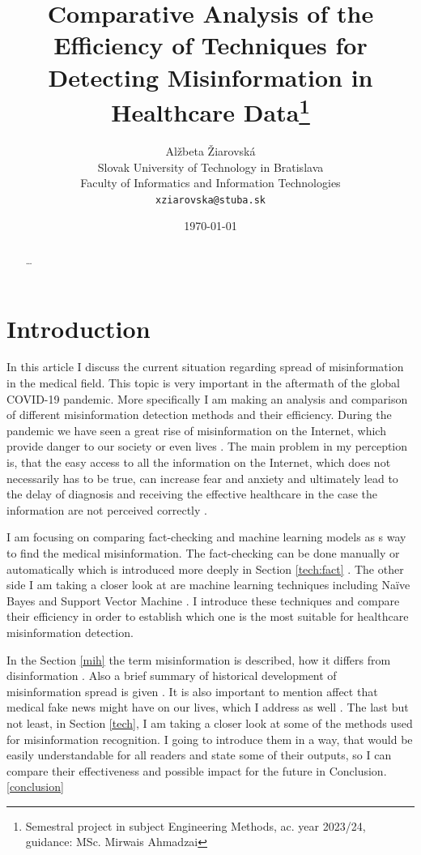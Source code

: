 \documentclass[11pt ,english,a4paper]{article}
\title{Comparative Analysis of the Efficiency of Techniques for Detecting Misinformation in Healthcare Data\thanks{Semestral project in subject Engineering Methods, ac. year 2023/24, guidance: MSc. Mirwais Ahmadzai}}
\author{Alžbeta Žiarovská\\[2pt]
	{\small Slovak University of Technology in Bratislava}\\
	{\small Faculty of Informatics and Information Technologies}\\
	{\small \texttt{xziarovska@stuba.sk}}
	}
\date{\small \today}
\begin{document}
\maketitle
\newpage

\begin{abstract}
\ldots
\end{abstract}
\newpage

\section{Introduction}\label{intro}

In this article I discuss the current situation regarding spread of misinformation in the medical field. This topic is very important in the aftermath of the global COVID-19 pandemic. More specifically I am making an analysis and comparison of different misinformation detection methods and their efficiency. During the pandemic we have seen a great rise of misinformation on the Internet, which provide danger to our society or even lives \cite{war18dr}. The main problem in my perception is, that the easy access to all the information on the Internet, which does not necessarily has to be true, can increase fear and anxiety and ultimately lead to the delay of diagnosis and receiving the effective healthcare in the case the information are not perceived correctly \cite{wa19sys}. 

I am focusing on comparing fact-checking and machine learning models as s way to find the medical misinformation. The fact-checking can be done manually or automatically which is introduced more deeply in Section \ref{tech:fact} \cite{bar21health}. The other side I am taking a closer look at are machine learning techniques including Naïve Bayes and Support Vector Machine \cite{bar21health}. I introduce these techniques and compare their efficiency in order to establish which one is the most suitable for healthcare misinformation detection.

In the Section \ref{mih} the term misinformation is described, how it differs from disinformation \cite{gu20misinfo}. Also a brief summary of historical development of misinformation spread is given \cite{pos18short}. It is also important to mention affect that medical fake news might have on our lives, which I address as well \cite{who22infodemics}. The last but not least, in Section \ref{tech}, I am taking a closer look at some of the methods used for misinformation recognition. I going to introduce them in a way, that would be easily understandable for all readers and state some of their outputs, so I can compare their effectiveness and possible impact for the future in Conclusion. \ref{conclusion}
\end{document}
